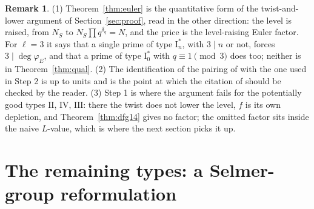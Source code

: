\documentclass[11pt]{amsart}
\theoremstyle{definition}
\newtheorem{remark}[theorem]{Remark}
\newcommand{\degphi}{\deg\varphi_E}
\begin{document}
\begin{remark}
(1) Theorem~\ref{thm:euler} is the quantitative form of the twist-and-lower argument of Section~\ref{sec:proof}, read in the other direction: the level is raised, from $N_S$ to $N_S\prod q^{\delta_q}=N$, and the price is the level-raising Euler factor. For $\ell=3$ it says that a single prime of type $\mathrm{I}_n^*$, with $3\mid n$ or not, forces $3\mid\degphi$, and that a prime of type $\mathrm{I}_0^*$ with $q\equiv1\pmod3$ does too; neither is in Theorem~\ref{thm:qual}. (2) The identification of the pairing of \cite[\S1.7.3]{DFG04} with the one used in Step 2 is up to units and is the point at which the citation of \cite{DFG04} should be checked by the reader. (3) Step 1 is where the argument fails for the potentially good types $\mathrm{II}$, $\mathrm{IV}$, $\mathrm{III}$: there the twist does not lower the level, $f$ is its own depletion, and Theorem~\ref{thm:dfg14} gives no factor; the omitted factor sits inside the naive $L$-value, which is where the next section picks it up.
\end{remark}

\section{The remaining types: a Selmer-group reformulation}\label{sec:selmer}
\end{document}
